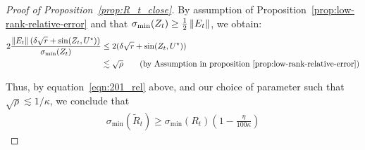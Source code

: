\begin{proof}[Proof of Proposition~\ref{prop:R_t_close}]
By assumption of Proposition~\ref{prop:low-rank-relative-error} and that $\sigma_{\min}(Z_t) \geq \frac{1}{2} \left\|E_t\right\|$, we obtain:
\begin{align}
 2\frac{\Norm{E_t} (\delta \sqrt{r} + \sin(Z_t, \bUg))}{\sigma_{\min}(Z_t)}
 &\leq 2(\delta \sqrt{r} + \sin(Z_t, \bUg))\nonumber
 \\
 & \lesssim \sqrt{\rho} \tag{{by Assumption in proposition~\ref{prop:low-rank-relative-error}}}
\end{align}

Thus, by equation~\eqref{eqn:201_rel} above, and our choice of parameter such that $\sqrt{\rho} \lesssim 1/\kappa$, we conclude that
\begin{align}
\sigma_{\min}(\tilde{R}_t ) \geq \sigma_{\min}(R_t)\left( 1 - \frac{\eta}{100 \kappa} \right)\nonumber
\end{align}
\end{proof}



